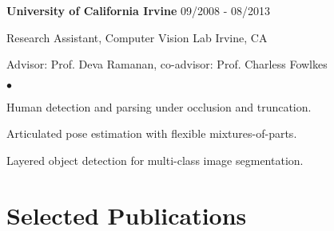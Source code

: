 \documentclass[margin]{res3}
\newenvironment{list1}{
  \begin{list}{\ding{113}}{%
      \setlength{\itemsep}{0.03in}
      \setlength{\parsep}{0in} \setlength{\parskip}{0in}
      \setlength{\topsep}{0in} \setlength{\partopsep}{0in}
      \setlength{\leftmargin}{0in}}}{\end{list}}
\newenvironment{list2}{
  \begin{list}{$\bullet$}{%
      \setlength{\itemsep}{0.02in}
      \setlength{\parsep}{0in} \setlength{\parskip}{0in}
      \setlength{\topsep}{0in} \setlength{\partopsep}{0in}
      \setlength{\leftmargin}{0.2in}}}{\end{list}}
\begin{document}
\begin{resume}
\begin{list1}
\item[] {\bf University of California Irvine} \hfill {09/2008 - 08/2013}
\vspace{-2pt}
\item[] Research Assistant, Computer Vision Lab \hfill {Irvine, CA}
\vspace{-2pt}
\item[] Advisor: Prof. Deva Ramanan, co-advisor: Prof. Charless Fowlkes

\begin{list2}
\item Human detection and parsing under occlusion and truncation.
\vspace{-2pt}
\item Articulated pose estimation with flexible mixtures-of-parts.
\vspace{-2pt}
\item Layered object detection for multi-class image segmentation.
\end{list2}
\vspace{5pt}




\end{list1}

\section{\sc Selected Publications}
\begin{list1}


\end{list1}
\end{resume}
\end{document}
